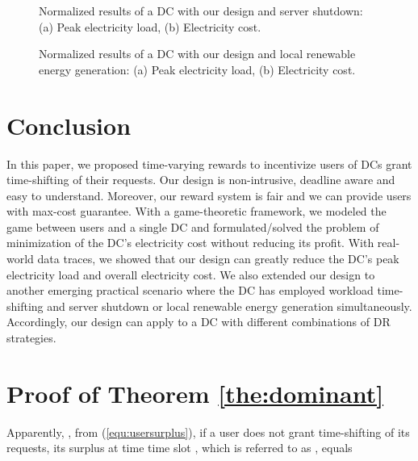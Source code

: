 \documentclass[conference]{IEEEtran}
\begin{document}
\begin{figure}[!t]
\centering
{}
\centering\caption{Normalized results of a DC with our design and server shutdown: (a) Peak electricity load, (b) Electricity cost.}\label{fig:impact_turn}
\end{figure}

\begin{figure}[!t]
\centering
{}
\centering\caption{Normalized results of a DC with our design and local renewable energy generation: (a) Peak electricity load, (b) Electricity cost.}\label{fig:impact_green}
\end{figure}


\section{Conclusion}\label{sec:conclusion}
In this paper, we proposed time-varying rewards to incentivize users of DCs grant time-shifting of their requests. Our design is non-intrusive, deadline aware and easy to understand. Moreover, our reward system is fair and we can provide users with max-cost guarantee. With a game-theoretic framework, we modeled the game between users and a single DC and formulated/solved the  problem of minimization of the DC's electricity cost without reducing its profit. With real-world data traces, we showed that our design can greatly reduce the DC's peak electricity load and overall electricity cost. We also extended our design to another emerging practical scenario where the DC has employed workload time-shifting and server shutdown or local renewable energy generation simultaneously. Accordingly, our design can apply to a DC with different combinations of DR strategies.


\appendices

\section{Proof of Theorem \ref{the:dominant}}\label{proo:dominant}
Apparently, , from (\ref{equ:usersurplus}), if a user does not grant time-shifting of its requests, its surplus at time time slot , which is referred to as , equals 
\end{document}
